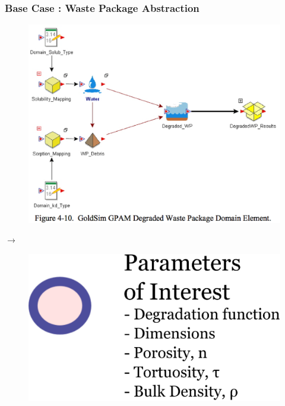 \begin{frame}[ctb!]
  \frametitle{Base Case : Waste Package Abstraction}
  \begin{minipage}{0.45\textwidth}
    \begin{figure}[h!]
      \begin{center}
        \includegraphics[width=\textwidth]{wp.eps}
      \end{center}
    \end{figure}
  \end{minipage}
  \hspace{0.01cm}\large{$\rightarrow$}\hspace{0.01cm}
  \begin{minipage}{0.45\textwidth}
    \begin{figure}[h!]
      \begin{center}
        \includegraphics[width=\textwidth]{abstractionWP.eps}
      \end{center}
    \end{figure}
  \end{minipage}
\end{frame}

